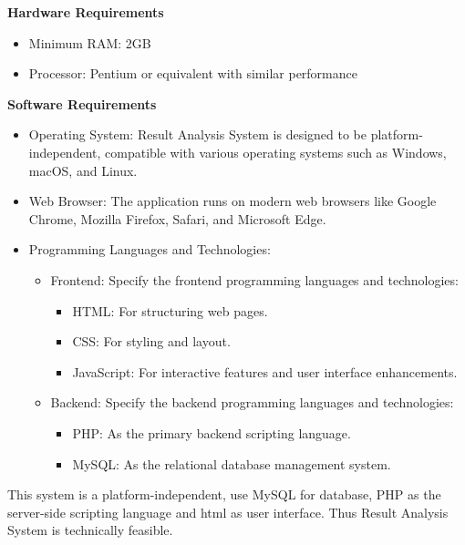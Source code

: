 \documentclass{nascproject}
\begin{document}
    \textbf{Hardware Requirements}
    \begin{itemize}
    	\item  Minimum RAM: 2GB
    	\item Processor: Pentium or equivalent with similar performance
    \end{itemize}
   
    
    \textbf{Software Requirements}
    \begin{itemize}
    	\item Operating System: Result Analysis System is designed to be platform-independent,
    	compatible with various operating systems such as Windows, macOS, and
    	Linux.
    	\item  Web Browser: The application runs on modern web browsers like Google
    	Chrome, Mozilla Firefox, Safari, and Microsoft Edge.
    	\item Programming Languages and Technologies:
    	\begin{itemize}
    		\item 	Frontend: Specify the frontend programming languages and technologies:
    		\begin{itemize}
    			\item HTML: For structuring web pages.
    			\item CSS: For styling and layout.
    			\item 	JavaScript: For interactive features and user interface enhancements.
    		\end{itemize}
    		\item 	Backend: Specify the backend programming languages and technologies:
    		\begin{itemize}
    			\item PHP: As the primary backend scripting language.
    			\item 	MySQL: As the relational database management system.
    		\end{itemize}
    	\end{itemize}	
   \end{itemize}
This system is a platform-independent, use MySQL for database, PHP as the server-side scripting language and html as user interface. Thus Result Analysis System is technically feasible.	
\end{document}
